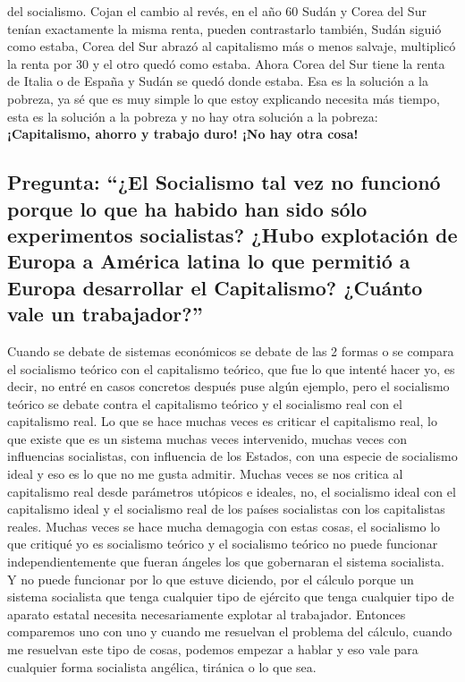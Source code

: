del socialismo. Cojan el cambio al revés, en el año 60 Sudán y Corea del Sur tenían exactamente la misma renta, pueden contrastarlo también, Sudán siguió como estaba, Corea del Sur abrazó al capitalismo más o menos salvaje, multiplicó la renta por 30 y el otro quedó como estaba. Ahora Corea del Sur tiene la renta de Italia o de España y Sudán se quedó donde estaba. Esa es la solución a la pobreza, ya sé que es muy simple lo que estoy explicando necesita más tiempo, esta es la solución a la pobreza y no hay otra solución a la pobreza: \textbf{¡Capitalismo, ahorro y trabajo duro! ¡No hay otra cosa!}

\subsection{Pregunta: \enquote{¿El Socialismo tal vez no funcionó porque lo que ha habido han sido sólo experimentos socialistas? ¿Hubo explotación de Europa a América latina lo que permitió a Europa desarrollar el Capitalismo? ¿Cuánto vale un trabajador?}}

Cuando se debate de sistemas económicos se debate de las 2 formas o se compara el socialismo teórico con el capitalismo teórico, que fue lo que intenté hacer yo, es decir, no entré en casos concretos después puse algún ejemplo, pero el socialismo teórico se debate contra el capitalismo teórico y el socialismo real con el capitalismo real. Lo que se hace muchas veces es criticar el capitalismo real, lo que existe que es un sistema muchas veces intervenido, muchas veces con influencias socialistas, con influencia de los Estados, con una especie de socialismo ideal y eso es lo que no me gusta admitir. Muchas veces se nos critica al capitalismo real desde parámetros utópicos e ideales, no, el socialismo ideal con el capitalismo ideal y el socialismo real de los países socialistas con los capitalistas reales. Muchas veces se hace mucha demagogia con estas cosas, el socialismo lo que critiqué yo es socialismo teórico y el socialismo teórico no puede funcionar independientemente que fueran ángeles los que gobernaran el sistema socialista. Y no puede funcionar por lo que estuve diciendo, por el cálculo porque un sistema socialista que tenga cualquier tipo de ejército que tenga cualquier tipo de aparato estatal necesita necesariamente explotar al trabajador. Entonces comparemos uno con uno y cuando me resuelvan el problema del cálculo, cuando me resuelvan este tipo de cosas, podemos empezar a hablar y eso vale para cualquier forma socialista angélica, tiránica o lo que sea.

